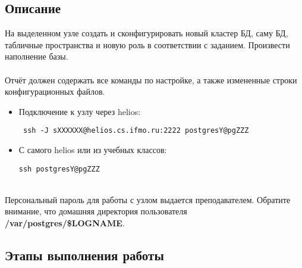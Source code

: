 \documentclass{article}
\begin{document}
\subsection{Описание}
На выделенном узле создать и сконфигурировать новый кластер БД, саму БД,
табличные пространства и новую роль в соответствии с заданием. Произвести
наполнение базы.
\\ \\
Отчёт должен содержать все команды по настройке, а также измененные строки
конфигурационных файлов.

\begin{itemize}
    \item  Подключение к узлу через helios: 
            \begin{verbatim} ssh -J sXXXXXX@helios.cs.ifmo.ru:2222 postgresY@pgZZZ\end{verbatim} 
    \item С самого helios или из учебных классов: 
            \begin{verbatim}ssh postgresY@pgZZZ\end{verbatim}
\end{itemize} 
\\
Персональный пароль для работы с узлом выдается преподавателем.
Обратите внимание, что домашняя директория пользователя \textbf{/var/postgres/\$LOGNAME}.
\subsection{Этапы выполнения работы}
\end{document}

